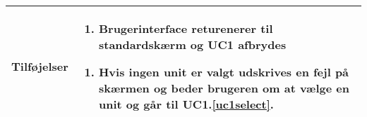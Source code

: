 \begin{table}[H]
\begin{tabular} {|p{6cm}|p{8cm}|}
		\textbf{Tilføjelser}					
		&\begin{enumerate}[label= \ref{uc1ex1}a.]
			\item Brugerinterface returenerer til standardskærm og UC1 afbrydes
		\end{enumerate}
											
		\begin{enumerate}[label= \ref{uc1ex2}a.]
			\item Hvis ingen unit er valgt udskrives en fejl på skærmen og beder brugeren om at vælge en unit og går til UC1.\ref{uc1select}.
		\end{enumerate} \\\hline
											

	\end{tabular}
	\label{UC1} 
\end{table}